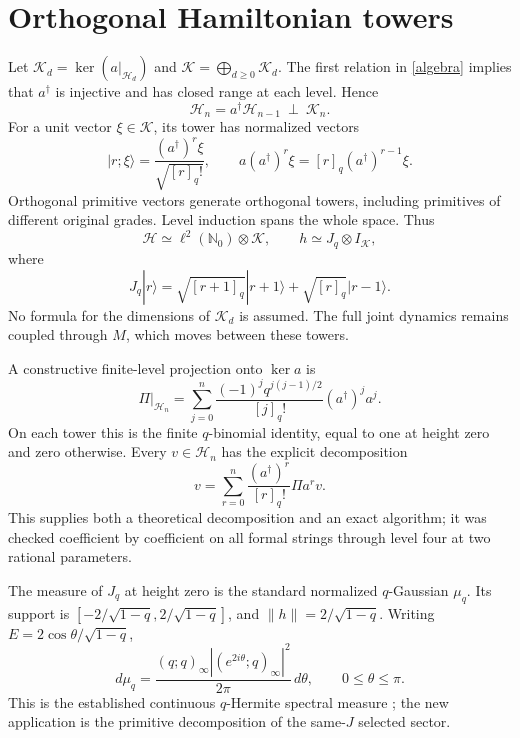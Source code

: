 \documentclass[11pt]{article}
\newcommand{\HH}{\mathcal H}
\newcommand{\K}{\mathcal K}
\newcommand{\qn}[1]{[#1]_q}
\begin{document}
\newpage
\section{Orthogonal Hamiltonian towers}
Let $\K_d=\ker(a|_{\HH_d})$ and $\K=\bigoplus_{d\ge0}\K_d$.
The first relation in \eqref{algebra} implies that $a^\dagger$
is injective and has closed range at each level. Hence
\begin{equation}
 \HH_n=a^\dagger\HH_{n-1}\ \mathbin{\perp}\ \K_n.
\end{equation}
For a unit vector $\xi\in\K$, its tower has normalized vectors
\begin{equation}
 |r;\xi\rangle=\frac{(a^\dagger)^r\xi}{\sqrt{\qn r!}},
 \qquad a(a^\dagger)^r\xi=\qn r(a^\dagger)^{r-1}\xi.
\end{equation}
Orthogonal primitive vectors generate orthogonal towers, including
primitives of different original grades. Level induction spans
the whole space. Thus
\begin{equation}\label{towers}
 \HH\simeq\ell^2(\mathbb N_0)\otimes\K,\qquad
 h\simeq J_q\otimes I_{\K},
\end{equation}
where
\begin{equation}
 J_q|r\rangle=\sqrt{\qn{r+1}}|r+1\rangle
              +\sqrt{\qn r}|r-1\rangle.
\end{equation}
No formula for the dimensions of $\K_d$ is assumed. The full
joint dynamics remains coupled through $M$, which moves between
these towers.

A constructive finite-level projection onto $\ker a$ is
\begin{equation}\label{projection}
 \Pi|_{\HH_n}=\sum_{j=0}^n
 \frac{(-1)^j q^{j(j-1)/2}}{\qn j!}(a^\dagger)^j a^j.
\end{equation}
On each tower this is the finite $q$-binomial identity, equal to
one at height zero and zero otherwise. Every $v\in\HH_n$ has
the explicit decomposition
\begin{equation}
 v=\sum_{r=0}^n\frac{(a^\dagger)^r}{\qn r!}\Pi a^r v.
\end{equation}
This supplies both a theoretical decomposition and an exact
algorithm; it was checked coefficient by coefficient on all
formal strings through level four at two rational parameters.

The measure of $J_q$ at height zero is the standard normalized
$q$-Gaussian $\mu_q$. Its support is
$[-2/\sqrt{1-q},2/\sqrt{1-q}]$, and $\|h\|=2/\sqrt{1-q}$.
Writing $E=2\cos\theta/\sqrt{1-q}$,
\begin{equation}\label{density}
 d\mu_q=\frac{(q;q)_\infty
          |(e^{2i\theta};q)_\infty|^2}{2\pi}\,d\theta,
 \qquad 0\le\theta\le\pi.
\end{equation}
This is the established continuous $q$-Hermite spectral measure
\cite{BNR}; the new application is the primitive decomposition
of the same-$J$ selected sector.
\end{document}
